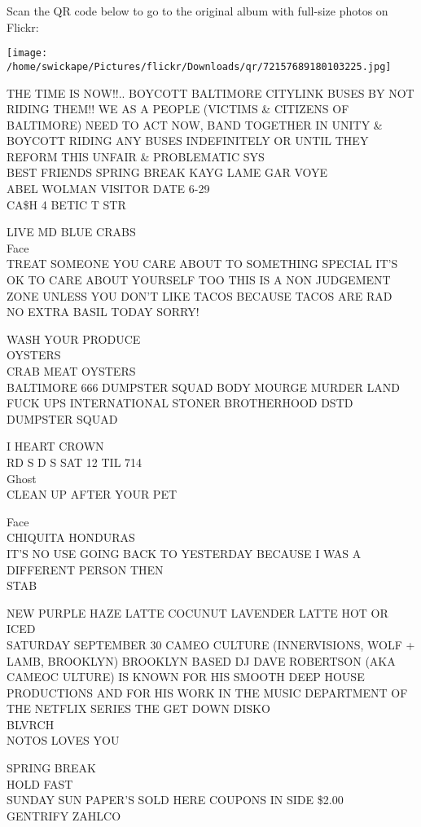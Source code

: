 \documentclass[10pt,letterpaper]{article}
\begin{document}
Scan the QR code below to go to the original album with full-size photos on Flickr:

\texttt{[image: /home/swickape/Pictures/flickr/Downloads/qr/72157689180103225.jpg]}


THE TIME IS NOW!!..  BOYCOTT BALTIMORE CITYLINK BUSES BY NOT RIDING THEM!!  WE AS A PEOPLE (VICTIMS \& CITIZENS OF BALTIMORE) NEED TO ACT NOW, BAND TOGETHER IN UNITY \& BOYCOTT RIDING ANY BUSES INDEFINITELY OR UNTIL THEY REFORM THIS UNFAIR \& PROBLEMATIC SYS\\
BEST FRIENDS SPRING BREAK KAYG LAME GAR VOYE\\
ABEL WOLMAN VISITOR DATE 6{-}29\\
CA\$H 4 BETIC T STR

LIVE MD BLUE CRABS\\
Face\\
TREAT SOMEONE YOU CARE ABOUT TO SOMETHING SPECIAL IT'S OK TO CARE ABOUT YOURSELF TOO THIS IS A NON JUDGEMENT ZONE UNLESS YOU DON'T LIKE TACOS BECAUSE TACOS ARE RAD\\
NO EXTRA BASIL TODAY SORRY!

WASH YOUR PRODUCE\\
OYSTERS\\
CRAB MEAT OYSTERS\\
BALTIMORE 666 DUMPSTER SQUAD BODY MOURGE MURDER LAND FUCK UPS INTERNATIONAL STONER BROTHERHOOD DSTD DUMPSTER SQUAD

I HEART CROWN\\
RD S D S SAT 12 TIL 714\\
Ghost\\
CLEAN UP AFTER YOUR PET

Face\\
CHIQUITA HONDURAS\\
IT'S NO USE GOING BACK TO YESTERDAY BECAUSE I WAS A DIFFERENT PERSON THEN\\
STAB

NEW PURPLE HAZE LATTE COCUNUT LAVENDER LATTE HOT OR ICED\\
SATURDAY SEPTEMBER 30 CAMEO CULTURE (INNERVISIONS, WOLF + LAMB, BROOKLYN) BROOKLYN BASED DJ DAVE ROBERTSON (AKA CAMEOC ULTURE) IS KNOWN FOR HIS SMOOTH DEEP HOUSE PRODUCTIONS AND FOR HIS WORK IN THE MUSIC DEPARTMENT OF THE NETFLIX SERIES THE GET DOWN DISKO\\
BLVRCH\\
NOTOS LOVES YOU

SPRING BREAK\\
HOLD FAST\\
SUNDAY SUN PAPER'S SOLD HERE COUPONS IN SIDE \$2.00\\
GENTRIFY ZAHLCO
\end{document}
